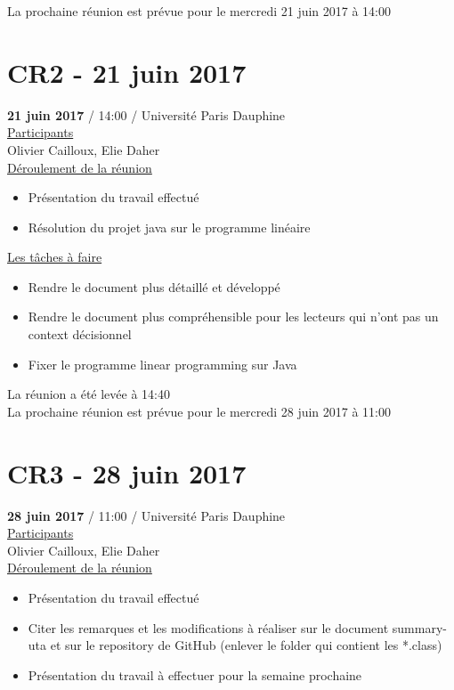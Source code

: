 \documentclass{report}
\begin{document}
\begin{appendices}
La prochaine réunion est prévue pour le mercredi 21 juin 2017 à 14:00


\newpage
\section{CR2 - 21 juin 2017}
\textbf{21 juin 2017} / 14:00 / Université Paris Dauphine \\

\underline{Participants} \\

Olivier Cailloux, Elie Daher\\

\underline{Déroulement de la réunion} \\
\begin{itemize}
	\item Présentation du travail effectué
	\item Résolution du projet java sur le programme linéaire\\
\end{itemize}

\underline{Les tâches à faire} \\
\begin{itemize}
	\item Rendre le document plus détaillé et développé
	\item Rendre le document plus compréhensible pour les lecteurs qui n’ont pas un context décisionnel
	\item Fixer le programme linear programming sur Java\\
\end{itemize}

La réunion a été levée à 14:40\\

La prochaine réunion est prévue pour le mercredi 28 juin 2017 à 11:00
\newpage
\section{CR3 - 28 juin 2017}
\textbf{28 juin 2017} / 11:00 / Université Paris Dauphine \\

\underline{Participants} \\

Olivier Cailloux, Elie Daher\\

\underline{Déroulement de la réunion}\\
\begin{itemize}
	\item Présentation du travail effectué
	\item Citer les remarques et les modifications à réaliser sur le document summary-uta et sur le repository de GitHub (enlever le folder qui contient les *.class)
	\item Présentation du travail à effectuer pour la semaine prochaine\\
\end{itemize}


\end{appendices}
\end{document}
